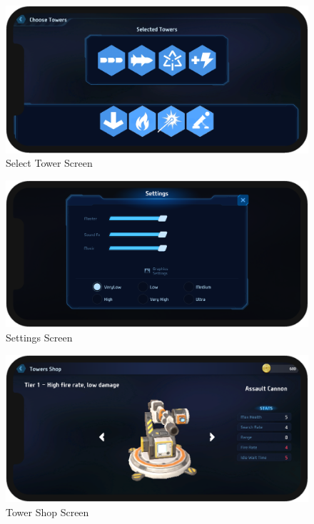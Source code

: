 \documentclass[12pt,a4paper]{report}
\begin{document}
\begin{figure}[h!]
	\centering
	\includegraphics[scale=0.5]{images/SelectTowerScreen.png}
	\caption{Select Tower Screen}
	\label{fig:SelectTowerScreen}
\end{figure}

\begin{figure}[h!]
	\centering
	\includegraphics[scale=0.5]{images/SettingScreen.png}
	\caption{Settings Screen}
	\label{fig:SettingScreen}
\end{figure}

\begin{figure}[h!]
	\centering
	\includegraphics[scale=0.5]{images/TowerShopScreen.png}
	\caption{Tower Shop Screen}
	\label{fig:TowerShopScreen}
\end{figure}
\end{document}
